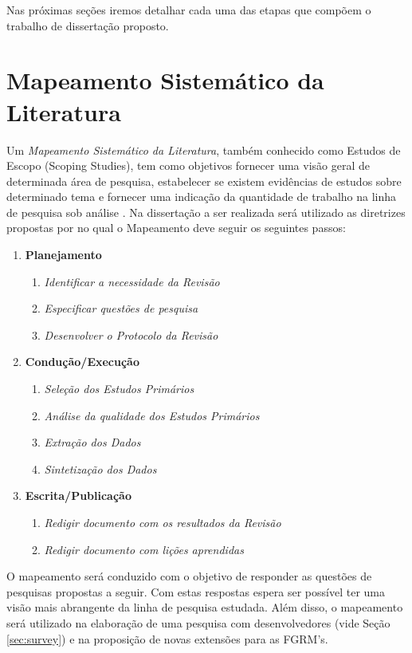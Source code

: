 \documentclass[msc,proposal,hidelot,hideabstract]{ppgccufmg} %
\begin{document}
Nas próximas seções iremos detalhar cada uma das etapas que compõem o trabalho de dissertação proposto.

\section{Mapeamento Sistemático da Literatura}
\label{sec:revisao_sistematica}

Um \textit{Mapeamento Sistemático da Literatura}, também conhecido como Estudos de Escopo (Scoping Studies), tem como objetivos fornecer uma visão geral de determinada área de pesquisa, estabelecer se existem evidências de estudos sobre determinado tema e fornecer uma indicação da quantidade de trabalho na linha de pesquisa sob análise \cite{keele2007guidelines,wohlin2012experimentation}. Na dissertação a ser realizada será utilizado as diretrizes propostas por \cite{keele2007guidelines} no qual o Mapeamento deve seguir os seguintes passos:

\begin{enumerate}
  \item \textbf{Planejamento}
  \begin{enumerate}
    \item \textit{Identificar a necessidade da Revisão}
    \item \textit{Especificar questões de pesquisa}
    \item \textit{Desenvolver o Protocolo da Revisão}
  \end{enumerate}
  \item \textbf{Condução/Execução}
  \begin{enumerate}
    \item \textit{Seleção dos Estudos Primários}
    \item \textit{Análise da qualidade dos Estudos Primários}
     \item \textit{Extração dos Dados}
     \item \textit{Sintetização dos Dados}
   \end{enumerate}
  \item \textbf{Escrita/Publicação}
  \begin{enumerate}
    \item \textit{Redigir documento com os resultados da Revisão}
    \item \textit{Redigir documento com lições aprendidas}
  \end{enumerate}
\end{enumerate}

O mapeamento será conduzido com o objetivo de responder as questões de pesquisas propostas a seguir. Com estas respostas espera ser possível ter uma visão mais abrangente da linha de pesquisa estudada. Além disso, o mapeamento será utilizado na elaboração de uma pesquisa com desenvolvedores (vide Seção \ref{sec:survey}) e na proposição de novas extensões para as FGRM's.
\end{document}
